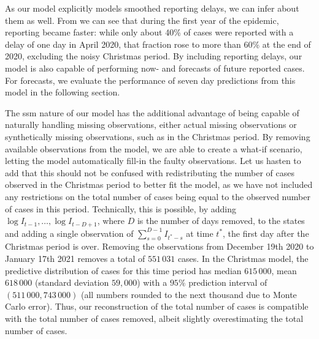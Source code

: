 As our model explicitly models smoothed reporting delays, we can infer about them as well. From  we can see that during the first year of the epidemic, reporting became faster: while only about 40\% of cases were reported with a delay of one day in April 2020, that fraction rose to more than 60\% at the end of 2020, excluding the noisy Christmas period. By including reporting delays, our model is also capable of performing now- and forecasts of future reported cases. For forecasts, we evaluate the performance of seven day predictions from this model in the following section.

The \gls{ssm} nature of our model has the additional advantage of being capable of naturally handling missing observations, either actual missing observations or synthetically missing observations, such as in the Christmas period. By removing available observations from the model, we are able to create a what-if scenario, letting the model automatically fill-in the faulty observations. Let us hasten to add that this should not be confused with redistributing the number of cases observed in the Christmas period to better fit the model, as we have not included any restrictions on the total number of cases being equal to the observed number of cases in this period. Technically, this is possible, by adding $\log I_{t - 1}, \dots, \log I_{t - D + 1}$, where $D$ is the number of days removed, to the states and adding a single observation of $\sum_{s = 0}^{D - 1} I_{t^{\ast} - s}$ at time $t^{\ast}$, the first day after the Christmas period is over. Removing the observations from December 19th 2020 to January 17th 2021 removes a total of $551\,031$ cases. In the Christmas model, the predictive distribution of cases for this time period has median $615\,000$, mean $618\,000$ (standard deviation $59,000$) with a $95\%$ prediction interval of $(511\,000, 743\,000)$ (all numbers rounded to the next thousand due to Monte Carlo error). Thus, our reconstruction of the total number of cases is compatible with the total number of cases removed, albeit slightly overestimating the total number of cases.

